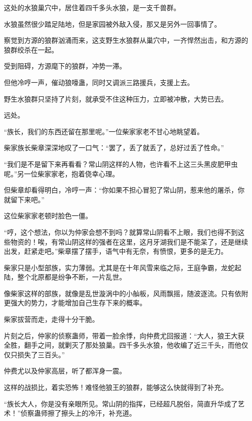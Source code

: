 
\begin{this_body}

这处的水狼巢穴中，居住着四千多头水狼，是一支千兽群。

水狼虽然很少踏足陆地，但是家园被外敌入侵，那又是另外一回事情了。

察觉到方源的狼群汹涌而来，这支野生水狼群从巢穴中，一齐悍然出击，和方源的狼群绞杀在一起。

受到阻碍，方源麾下的狼群，冲势一滞。

但他冷哼一声，催动狼嚎蛊，同时又调派三路援兵，支援上去。

野生水狼群只坚持了片刻，就承受不住这种压力，立即被冲散，大势已去。

远处。

“族长，我们的东西还留在那里呢。”一位柴家家老不甘心地眺望着。

柴家族长柴章深深地叹了一口气：“罢了，丢了就丢了，总好过丢了性命。”

“我们是不是留下来再看看？常山阴这样的人物，也许看不上这三头黑皮肥甲虫呢。”另一位柴家家老，抱着侥幸心理。

但柴章却看得明白，冷哼一声：“你如果不担心冒犯了常山阴，惹来他的屠杀，你就留下来吧。”

这位柴家家老顿时脸色一僵。

“哼，这个想法，你以为仲家会想不到吗？就算常山阴看不上眼，我们也得不到这些物资的！唉，有常山阴这样的强者在这里，这月牙湖我们是不能呆了，还是继续出发，赶紧走吧。”柴章摆了摆手，语气中有无奈，有愤恨，更多的是无力。

柴家只是小型部族，实力薄弱。尤其是在十年风雪来临之际，王庭争霸，龙蛇起陆，整个北原都是纷争不断，一片乱世。

像柴家这样的部族，就像是乱世漩涡中的小舢板，风雨飘摇，随波逐流。只有依附更强大的势力，才能增加自己生存下来的概率。

柴家拔营而走，走得十分干脆。

片刻之后，仲家的侦察蛊师，带着一脸余悸，向仲费尤回报道：“大人，狼王大获全胜，翻手之间，就剿灭了那处狼巢。四千多头水狼，他收编了近三千头，而他仅仅只损失了三百头。”

仲费尤以及仲家高层，听了都浑身一震。

这样的战损比，着实恐怖！难怪他狼王的狼群，能够这么快就得到了补充。

“族长大人，你是没有亲眼所见。常山阴的指挥，已经超凡脱俗，简直升华成了艺术！”侦察蛊师擦了擦头上的冷汗，补充道。


\end{this_body}
